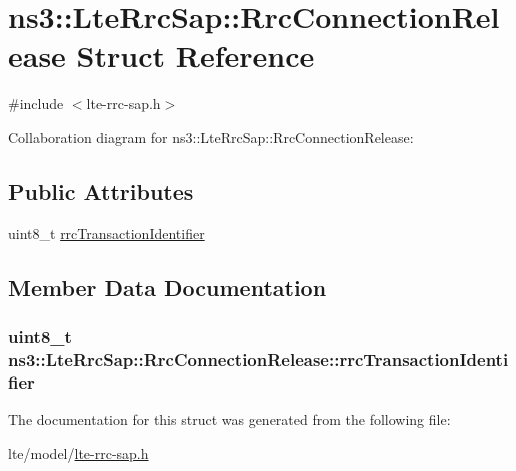 \hypertarget{structns3_1_1LteRrcSap_1_1RrcConnectionRelease}{}\section{ns3\+:\+:Lte\+Rrc\+Sap\+:\+:Rrc\+Connection\+Release Struct Reference}
\label{structns3_1_1LteRrcSap_1_1RrcConnectionRelease}


{\ttfamily \#include $<$lte-\/rrc-\/sap.\+h$>$}



Collaboration diagram for ns3\+:\+:Lte\+Rrc\+Sap\+:\+:Rrc\+Connection\+Release\+:
\subsection*{Public Attributes}
\begin{DoxyCompactItemize}
\item 
uint8\+\_\+t \hyperlink{structns3_1_1LteRrcSap_1_1RrcConnectionRelease_ae42253cc116e82e0bd157fabd6ecfeb3}{rrc\+Transaction\+Identifier}
\end{DoxyCompactItemize}


\subsection{Member Data Documentation}
\subsubsection[{\texorpdfstring{rrc\+Transaction\+Identifier}{rrcTransactionIdentifier}}]{\setlength{\rightskip}{0pt plus 5cm}uint8\+\_\+t ns3\+::\+Lte\+Rrc\+Sap\+::\+Rrc\+Connection\+Release\+::rrc\+Transaction\+Identifier}\hypertarget{structns3_1_1LteRrcSap_1_1RrcConnectionRelease_ae42253cc116e82e0bd157fabd6ecfeb3}{}\label{structns3_1_1LteRrcSap_1_1RrcConnectionRelease_ae42253cc116e82e0bd157fabd6ecfeb3}


The documentation for this struct was generated from the following file\+:\begin{DoxyCompactItemize}
\item 
lte/model/\hyperlink{lte-rrc-sap_8h}{lte-\/rrc-\/sap.\+h}\end{DoxyCompactItemize}
